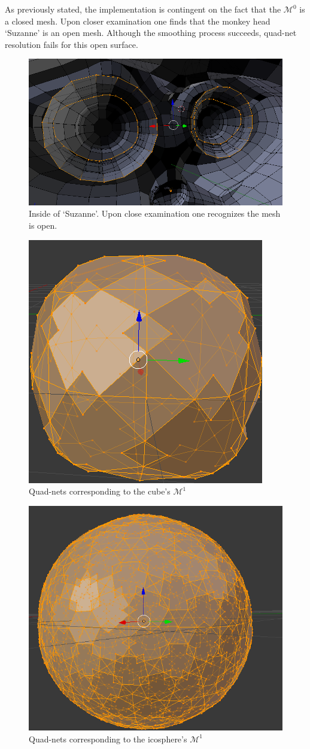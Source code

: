 \documentclass[11pt]{article}
\begin{document}
	\vspace{0.75in}
	As previously stated, the implementation is contingent on the fact that the $\mathcal{M}^0$ is a closed mesh. Upon closer examination one finds that the monkey head `Suzanne' is an open mesh. Although the smoothing process succeeds, quad-net resolution fails for this open surface. \\

	\begin{figure}[h]
		\centering
		\captionsetup{justification=centering}
		\includegraphics[width=.5\linewidth]{img/quad_monkey}
		\caption{Inside of `Suzanne'. Upon close examination one recognizes the mesh is open.}	
	\end{figure}
	
	\pagebreak
	
	\begin{figure}[h]
		\vspace{0.35in}
		\centering
		\captionsetup{justification=centering}
		\includegraphics[width=.5\linewidth]{img/quad_cube_2}
		\caption{Quad-nets corresponding to the cube's $\mathcal{M}^1$}	
	\end{figure}
	
	\vspace{0.25in}
	
	\begin{figure}[bp!]
		\centering
		\captionsetup{justification=centering}
		\includegraphics[width=.5\linewidth]{img/quad_icosphere_2}
		\caption{Quad-nets corresponding to the icosphere's $\mathcal{M}^1$}	
	\end{figure}
	\quad
	\pagebreak
\end{document}
